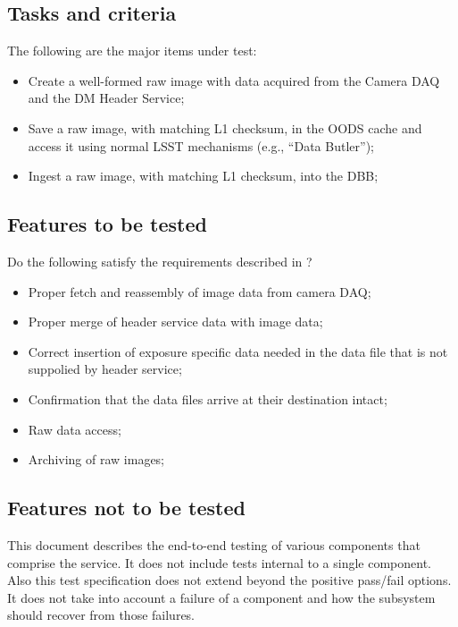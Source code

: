 \documentclass[DM,lsstdraft,STS,toc]{lsstdoc}
\begin{document}
\subsection{Tasks and criteria}
\label{sec:tasks}


The following are the major items under test:


\begin{itemize}
\item{Create a well-formed raw image with data acquired from the Camera DAQ and the DM Header Service; }
\item{Save a raw image, with matching L1 checksum, in the OODS cache and access it using normal LSST mechanisms (e.g., ``Data Butler''); }
\item{Ingest a raw image, with matching L1 checksum, into the DBB; }
\end{itemize}




\subsection{Features to be tested}
\label{sec:feat2test}


Do the following satisfy the requirements described in ?
\begin{itemize}
\item{Proper fetch and reassembly of image data from camera DAQ;}
\item{Proper merge of header service data with image data;}
\item{Correct insertion of exposure specific data needed in the data file that is not suppolied by header service;}
\item{Confirmation that the data files arrive at their destination intact;}
\item{Raw data access;}
\item{Archiving of raw images;}
\end{itemize}


\subsection{Features not to be tested}
\label{sec:featnot2test}


This document describes the end-to-end testing of various components
that comprise the service. It does not include tests internal to
a single component. Also this test specification does not
extend beyond the positive pass/fail options. It does not take
into account a failure of a component and how the subsystem should
recover from those failures.
\end{document}
